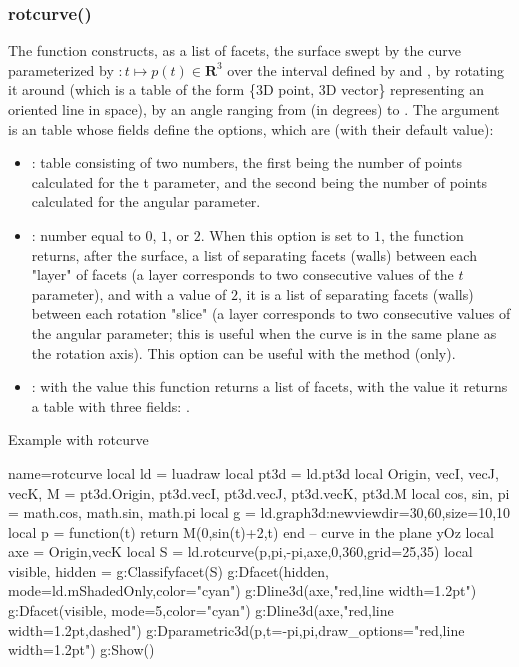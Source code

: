 \subsubsection{rotcurve()}
The function  constructs, as a list of facets, the surface swept by the curve parameterized by $\colon t\mapsto p(t)\in \mathbf R^3$ over the interval defined by  and , by rotating it around  (which is a table of the form \{3D point, 3D vector\} representing an oriented line in space), by an angle ranging from  (in degrees) to . The argument  is an table whose fields define the options, which are (with their default value):
\begin{itemize}
    \item {}: table consisting of two numbers, the first being the number of points calculated for the t parameter, and the second being the number of points calculated for the angular parameter.

    \item {}: number equal to $0$, $1$, or $2$. When this option is set to $1$, the function returns, after the surface, a list of separating facets (walls) between each "layer" of facets (a layer corresponds to two consecutive values ​​of the $t$ parameter), and with a value of $2$, it is a list of separating facets (walls) between each rotation "slice" (a layer corresponds to two consecutive values ​​of the angular parameter; this is useful when the curve is in the same plane as the rotation axis). This option can be useful with the  method (only).
    
       \item {} : with the value \false this function returns a list of facets, with the value \true it returns a table with three fields: . 
\end{itemize}

\begin{demo}{Example with rotcurve}
\begin{luadraw}{name=rotcurve}
local ld = luadraw
local pt3d = ld.pt3d
local Origin, vecI, vecJ, vecK, M = pt3d.Origin, pt3d.vecI, pt3d.vecJ, pt3d.vecK, pt3d.M
local cos, sin, pi = math.cos, math.sin, math.pi
local g = ld.graph3d:new{viewdir={30,60},size={10,10}}
local p = function(t) return M(0,sin(t)+2,t) end -- curve in the plane yOz
local axe = {Origin,vecK}
local S = ld.rotcurve(p,pi,-pi,axe,0,360,{grid={25,35}})
local visible, hidden = g:Classifyfacet(S)
g:Dfacet(hidden, {mode=ld.mShadedOnly,color="cyan"})
g:Dline3d(axe,"red,line width=1.2pt")
g:Dfacet(visible, {mode=5,color="cyan"})
g:Dline3d(axe,"red,line width=1.2pt,dashed")
g:Dparametric3d(p,{t={-pi,pi},draw_options="red,line width=1.2pt"})
g:Show()
\end{luadraw}
\end{demo}

